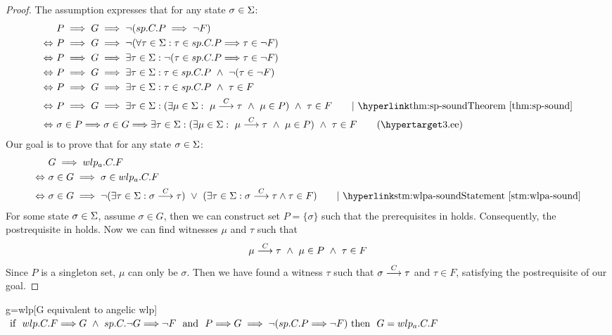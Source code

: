 \begin{proof}
	The assumption expresses that for any state $\sigma\in\S$:
\begin{align*} 
	&\ P\implies G \implies \neg(sp.C.P \implies \neg F) \\ 
	\Leftrightarrow&\ P\implies G \implies \neg(\forall\tau\in\S:\tau\in sp.C.P{\implies}\tau\in\neg F) \\ 
	\Leftrightarrow&\ P\implies G \implies \exists\tau\in\S:\neg(\tau\in sp.C.P{\implies}\tau\in\neg F) \\ 
	\Leftrightarrow&\ P\implies G \implies \exists\tau\in\S:\tau\in sp.C.P\ \wedge\ \neg(\tau\in\neg F) \\ 
	\Leftrightarrow&\ P\implies G \implies \exists\tau\in\S:\tau\in sp.C.P\ \wedge\ \tau\in F \\ 
	\Leftrightarrow&\ P\implies G \implies \exists\tau\in\S:(\exists \mu\in\S:\ \mu\goto{C}\tau\ \wedge\ \mu\in P)\ \wedge\ \tau\in F \tag*{$\mid$ \thm{sp-sound}}\\ 
	\Leftrightarrow&\ \sigma\in P {\implies} \sigma\in G {\implies} \exists\tau\in\S:(\exists \mu\in\S:\ \mu\goto{C}\tau\ \wedge\ \mu\in P)\ \wedge\ \tau\in F \tag{\lblth{e}}\\ 
\end{align*}
Our goal is to prove that for any state $\sigma\in\S$:
\begin{align*}
	&\ G\implies wlp_a.C.F \\ 
	\Leftrightarrow&\  \sigma\in G\implies\sigma\in wlp_a.C.F\\
	\Leftrightarrow&\ \sigma\in G\implies \neg(\exists \tau\in\S: \sigma\goto{C}\tau) \ \vee\ 
	(\exists \tau\in\S: \sigma\goto{C}\tau\wedge  \tau\in F) \tag*{$\mid$ \stm{wlpa-sound}}\\
\end{align*}
For some state $\sigma\in\S$, assume $\sigma\in G$, then we can construct set $P=\{\sigma\}$ such that the prerequisites in  holds. 
Consequently, the postrequisite in holds. 
Now we can find witnesses $\mu$ and $\tau$ such that
$$
\mu\goto{C}\tau\ \wedge\ \mu\in P\ \wedge\ \tau\in F 
$$
Since $P$ is a singleton set, $\mu$ can only be $\sigma$. 
Then we have found a witness $\tau$ such that $\sigma\goto{C}\tau$ and $\tau\in F$, satisfying the postrequisite of our goal. 
\end{proof}

\begin{corollary}{g=wlp}[G equivalent to angelic wlp]
	\ \\
	$\text{ if } \ wlp.C.F{\implies} G \ \wedge\ 
	sp.C.\neg G {\implies} \neg F 
	\ \text{ and } \ 
	P{\implies} G \implies \neg(sp.C.P {\implies} \neg F) \\
	\text{ then }\ G = wlp_a.C.F$
\end{corollary}

